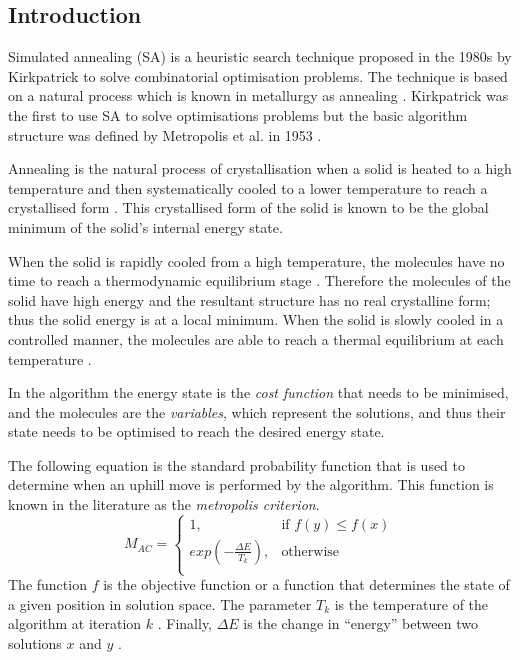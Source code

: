 \subsection{Introduction}
\label{sec:SAIntroduction}
Simulated annealing (SA) is a heuristic search technique proposed in the 1980s by Kirkpatrick to solve combinatorial optimisation problems. The technique is based on a natural process which is known in metallurgy as annealing \cite{CurveFittingSA,SASingleMultiObj,TempCyclingSA,ChaosSA}. Kirkpatrick was the first to use SA to solve optimisations problems but the basic algorithm structure was defined by Metropolis et al. in 1953 \cite{CurveFittingSA,VeryFastSAImageEnchancement}.

Annealing is the natural process of crystallisation when a solid is heated to a high temperature and then systematically cooled to a lower temperature to reach a crystallised form \cite{CurveFittingSA,NewSAs,MobileRobotSA,ConstantTempSA}. This crystallised form of the solid is known to be the global minimum of the solid's internal energy state. 

When the solid is rapidly cooled from a high temperature, the molecules have no time to reach a thermodynamic equilibrium stage \cite{CurveFittingSA,NewSAs,MobileRobotSA,ConstantTempSA}. Therefore the molecules of the solid have high energy and the resultant structure has no real crystalline form; thus the solid energy is at a local minimum\cite{CurveFittingSA,NewSAs,MobileRobotSA}. When the solid is slowly cooled in a controlled manner, the molecules are able to reach a thermal equilibrium at each temperature \cite{ChaosSA,CurveFittingSA,NewSAs,MobileRobotSA,ConstantTempSA}.

In the algorithm the energy state is the \emph{cost function} that needs to be minimised, and the molecules are the \emph{variables}, which represent the solutions, and thus their state needs to be optimised to reach the desired energy state.

The following equation is the standard probability function that is used to determine when an uphill move is performed by the algorithm. This function is known in the literature as the \emph{metropolis criterion}. 
\begin{equation}
\label{eq:saprobability}
	M_{AC} =
	\begin{cases}
	1, &\text{if $f(y) \leq f(x)$}\\
	exp(-\frac{\Delta E}{T_k}), &\text{otherwise}\\
	\end{cases}
\end{equation}
The function $f$ is the objective function or a function that determines the state of a given position in solution space\cite{EcoEquilSA}. The parameter $T_k$ is the temperature of the algorithm at iteration $k$ \cite{EcoEquilSA}. Finally, $\Delta E$ is the change in ``energy'' between two solutions $x$ and $y$ \cite{EcoEquilSA}.

